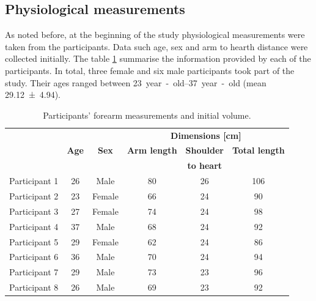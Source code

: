 \subsection{Physiological measurements}
\label{section procedure 1.2}
As noted before, at the beginning of the study physiological measurements were taken from the participants. Data such age, sex and arm to hearth distance were collected initially. The table \ref{tbl:physiological} summarise the information provided by each of the participants. In total, three female and six male participants took part of the study. Their ages ranged between \SIrange{23}{37}{year-old} (mean \num{29.12(494)}). 

\begin{table}[!ht] %
	\caption{Participants' forearm measurements and initial volume.}
	\label{tbl:physiological}
	\centering
	\begin{tabular}{lcc|ccc}
		\toprule
		&              &              &         \multicolumn{3}{c}{\textbf{Dimensions [\si{\cm}]}}         \\
		& \textbf{Age} & \textbf{Sex} & \textbf{Arm length} & \textbf{Shoulder} & \textbf{Total length} \\
		&              &              &                     &  \textbf{to heart}   &                       \\ \midrule
		Participant 1 &      26      &     Male     &         80          &          26          &          106          \\
		Participant 2 &      23      &    Female    &         66          &          24          &          90           \\
		Participant 3 &      27      &    Female    &         74          &          24          &          98           \\
		Participant 4 &      37      &     Male     &         68          &          24          &          92           \\
		Participant 5 &      29      &    Female    &         62          &          24          &          86           \\
		Participant 6 &      36      &     Male     &         70          &          24          &          94           \\
		Participant 7 &      29      &     Male     &         73          &          23          &          96           \\
		Participant 8 &      26      &     Male     &         69          &          23          &          92           \\ \bottomrule
	\end{tabular}
\end{table}

